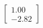 \documentclass[preview]{standalone}
\begin{document}
\begin{align*}
\begin{bmatrix} 1.00 \\ -2.82 \end{bmatrix}
\end{align*}
\end{document}
